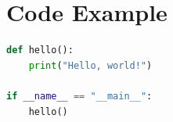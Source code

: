 \documentclass{article}
\begin{document}
\section{Code Example}

\begin{lstlisting}[language=Python,caption={Python Example}]
def hello():
    print("Hello, world!")

if __name__ == "__main__":
    hello()
\end{lstlisting}
\end{document}
